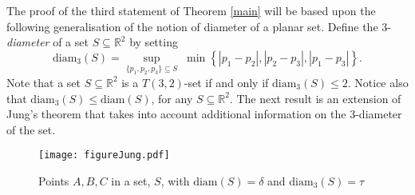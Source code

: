 \documentclass[12pt]{article}
\begin{document}
The proof of the third statement of Theorem \ref{main} will be based upon the following 
generalisation of the notion of diameter of a planar set.
Define the $3$-\emph{diameter} of a set $S\subseteq \mathbb{R}^2$ by setting
\[ \text{diam}_3(S) = \sup_{\{p_1,p_2,p_3\}\subseteq S} \; 
\min\left\{ |p_1-p_2|,  |p_2-p_3|, |p_1-p_3|\right\} . \]
Note that a set $S\subseteq \mathbb{R}^2$
is a  $T(3,2)$-set if and only if $\text{diam}_3(S) \leq 2$. Notice also that 
$\text{diam}_3(S) \leq \text{diam}(S)$, for any $S\subseteq \mathbb{R}^2$.
The next result is an extension of Jung's theorem  
that takes into account additional information on the $3$-diameter of the set.


\begin{figure}[htbp]
   \centering
   \texttt{[image: figureJung.pdf]} \caption{\small{Points $A,B,C$ in a set, $S$, with $\text{diam}(S)=\delta$ and $\text{diam}_3(S)=\tau$}}
   \label{fig:example}
\end{figure}
\end{document}
